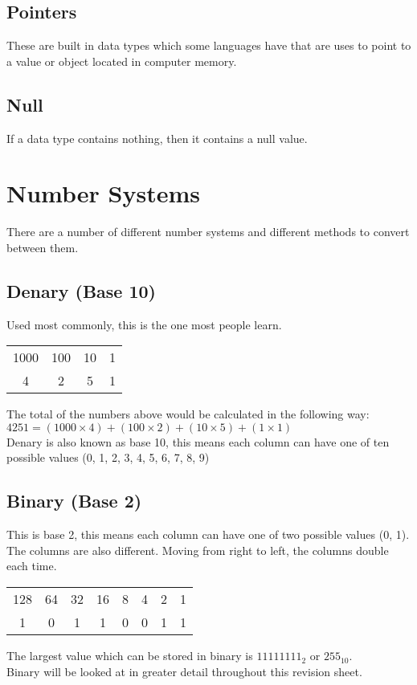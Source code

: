 \documentclass[a4paper,11pt, twocolumn]{article}
\begin{document}
\subsection{Pointers}
These are built in data types which some languages have that are uses to point to a value or object located in computer memory.
\subsection{Null}
If a data type contains nothing, then it contains a null value.

\section{Number Systems}
There are a number of different number systems and different methods to convert between them. 
\subsection{Denary (Base 10)}
Used most commonly, this is the one most people learn.
\begin{table}[H]
    \centering
    \begin{tabularx}{0.9\linewidth}{c c c c}
        1000 & 100 & 10 & 1 \\
        4 & 2 & 5 & 1
    \end{tabularx}
\end{table}
\noindent The total of the numbers above would be calculated in the following way:\\
$4251=(1000\times 4) + (100 \times 2) + (10 \times 5) + (1 \times 1)$\\
Denary is also known as base 10, this means each column can have one of ten possible values (0, 1, 2, 3, 4, 5, 6, 7, 8, 9)
\subsection{Binary (Base 2)}
This is base 2, this means each column can have one of two possible values (0, 1). The columns are also different. Moving from right to left, the columns double each time.
\begin{table}[H]
    \centering
    \begin{tabularx}{0.9\linewidth}{c c c c c c c c}
        128 & 64 & 32 & 16 & 8 & 4 & 2 & 1 \\
        1 & 0 & 1 & 1 & 0 & 0 & 1 & 1
    \end{tabularx}
\end{table}
\noindent The largest value which can be stored in binary is $11111111_2$ or $255_{10}$. \\
Binary will be looked at in greater detail throughout this revision sheet.
\end{document}
